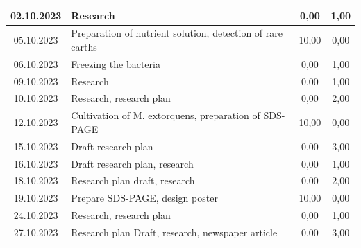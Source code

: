 \begin{longtable}{|c|p{7cm}|c|c|}
    02.10.2023    & Research                                                                                                        & 0,00                 & 1,00              \\ \hline
    05.10.2023    & Preparation of nutrient solution, detection of rare earths                                                      & 10,00                & 0,00              \\ \hline
    06.10.2023    & Freezing the bacteria                                                                                           & 0,00                 & 1,00              \\ \hline
    09.10.2023    & Research                                                                                                        & 0,00                 & 1,00              \\ \hline
    10.10.2023    & Research, research plan                                                                                         & 0,00                 & 2,00              \\ \hline
    12.10.2023    & Cultivation of M. extorquens, preparation of SDS-PAGE                                                           & 10,00                & 0,00              \\ \hline
    15.10.2023    & Draft research plan                                                                                             & 0,00                 & 3,00              \\ \hline
    16.10.2023    & Draft research plan, research                                                                                   & 0,00                 & 1,00              \\ \hline
    18.10.2023    & Research plan draft, research                                                                                   & 0,00                 & 2,00              \\ \hline
    19.10.2023    & Prepare SDS-PAGE, design poster                                                                                 & 10,00                & 0,00              \\ \hline
    24.10.2023    & Research, research plan                                                                                         & 0,00                 & 1,00              \\ \hline
    27.10.2023    & Research plan Draft, research, newspaper article                                                                & 0,00                 & 3,00              \\ \hline

\end{longtable}
